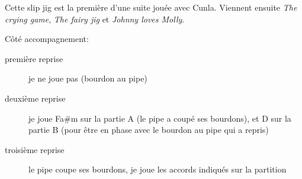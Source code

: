 Cette slip jig est la première d'une suite jouée avec Cunla. Viennent ensuite
\emph{The crying game}, \emph{The fairy jig} et \emph{Johnny loves Molly}.

\tune

Côté accompagnement:
\begin{description}
\item[première reprise] je ne joue pas (bourdon au pipe)
\item[deuxième reprise] je joue Fa\#m sur la partie A (le pipe a coupé ses
  bourdons), et D sur la partie B (pour être en phase avec le bourdon au pipe
  qui a repris)
\item[troisième reprise] le pipe coupe ses bourdons, je joue les accords
  indiqués sur la partition
\end{description}
